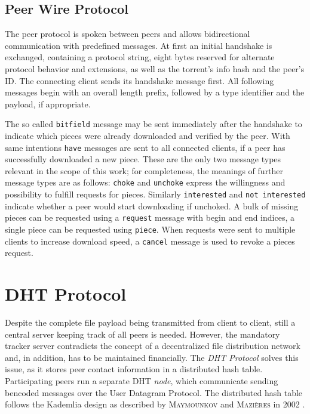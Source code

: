 \documentclass[10pt, a4paper, twoside, headsepline]{scrbook}
\renewcommand{\_}{\origunderscore\allowbreak}
\begin{document}
\subsection{Peer Wire Protocol}
The peer protocol is spoken between peers and allows bidirectional communication with predefined messages. At first an initial handshake is exchanged, containing a protocol string, eight bytes reserved for alternate protocol behavior and extensions, as well as the torrent's info hash and the peer's ID. The connecting client sends its handshake message first. All following messages begin with an overall length prefix, followed by a type identifier and the payload, if appropriate.

The so called \texttt{bitfield} message may be sent immediately after the handshake to indicate which pieces were already downloaded and verified by the peer. With same intentions \texttt{have} messages are sent to all connected clients, if a peer has successfully downloaded a new piece. These are the only two message types relevant in the scope of this work; for completeness, the meanings of further message types are as follows: \texttt{choke} and \texttt{unchoke} express the willingness and possibility to fulfill requests for pieces. Similarly \texttt{interested} and \texttt{not interested} indicate whether a peer would start downloading if unchoked. A bulk of missing pieces can be requested using a \texttt{request} message with begin and end indices, a single piece can be requested using \texttt{piece}. When requests were sent to multiple clients to increase download speed, a \texttt{cancel} message is used to revoke a pieces request.

\section{DHT Protocol}
Despite the complete file payload being transmitted from client to client, still a central server keeping track of all peers is needed. However, the mandatory tracker server contradicts the concept of a decentralized file distribution network and, in addition, has to be maintained financially. The \emph{DHT Protocol} \cite{bep5} solves this issue, as it stores peer contact information in a distributed hash table. Participating peers run a separate DHT \emph{node}, which communicate sending bencoded messages over the User Datagram Protocol. The distributed hash table follows the Kademlia design as described by \textsc{Maymounkov} and \textsc{Mazières} in 2002 \cite{kademlia}.
\end{document}
